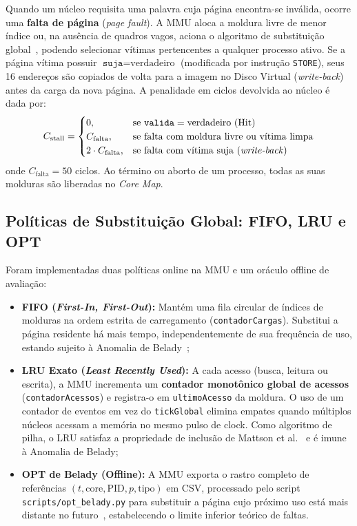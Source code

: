 \documentclass[conference]{IEEEtran}
\begin{document}
Quando um núcleo requisita uma palavra cuja página encontra-se inválida, ocorre uma \textbf{falta de página} (\textit{page fault}). A MMU aloca a moldura livre de menor índice ou, na ausência de quadros vagos, aciona o algoritmo de substituição global~\cite{tanenbaum2015}, podendo selecionar vítimas pertencentes a qualquer processo ativo. Se a página vítima possuir $\texttt{suja} = \text{verdadeiro}$ (modificada por instrução \texttt{STORE}), seus 16 endereços são copiados de volta para a imagem no Disco Virtual (\textit{write-back}) antes da carga da nova página. A penalidade em ciclos devolvida ao núcleo é dada por:
\begin{equation}
C_{\text{stall}} = \begin{cases}
0, & \text{se } \texttt{valida} = \text{verdadeiro (Hit)} \\
C_{\text{falta}}, & \text{se falta com moldura livre ou vítima limpa} \\
2 \cdot C_{\text{falta}}, & \text{se falta com vítima suja (\textit{write-back})}
\end{cases}
\end{equation}
onde $C_{\text{falta}} = 50$ ciclos. Ao término ou aborto de um processo, todas as suas molduras são liberadas no \textit{Core Map}.

\subsection{Políticas de Substituição Global: FIFO, LRU e OPT}
Foram implementadas duas políticas online na MMU e um oráculo offline de avaliação:
\begin{itemize}
    \item \textbf{FIFO (\textit{First-In, First-Out}):} Mantém uma fila circular de índices de molduras na ordem estrita de carregamento (\texttt{contadorCargas}). Substitui a página residente há mais tempo, independentemente de sua frequência de uso, estando sujeito à Anomalia de Belady~\cite{belady1969};
    \item \textbf{LRU Exato (\textit{Least Recently Used}):} A cada acesso (busca, leitura ou escrita), a MMU incrementa um \textbf{contador monotônico global de acessos} (\texttt{contadorAcessos}) e registra-o em \texttt{ultimoAcesso} da moldura. O uso de um contador de eventos em vez do \texttt{tickGlobal} elimina empates quando múltiplos núcleos acessam a memória no mesmo pulso de clock. Como algoritmo de pilha, o LRU satisfaz a propriedade de inclusão de Mattson et al.~\cite{mattson1970} e é imune à Anomalia de Belady;
    \item \textbf{OPT de Belady (Offline):} A MMU exporta o rastro completo de referências $(t, \text{core}, \text{PID}, p, \text{tipo})$ em CSV, processado pelo script \texttt{scripts/opt\_belady.py} para substituir a página cujo próximo uso está mais distante no futuro~\cite{belady1966}, estabelecendo o limite inferior teórico de faltas.
\end{itemize}
\end{document}
